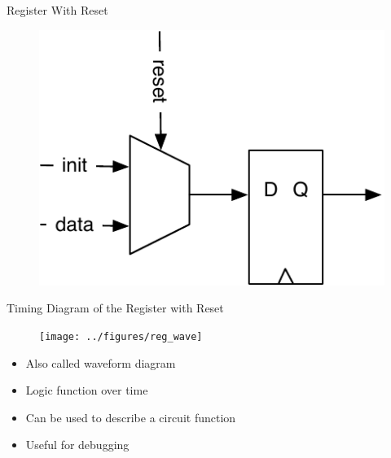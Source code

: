 \begin{frame}[fragile]{Register With Reset}
\begin{figure}
  \includegraphics[scale=\scale]{../figures/register-reset}
\end{figure}
\end{frame}

\begin{frame}[fragile]{Timing Diagram of the Register with Reset}
\begin{figure}
  \texttt{[image: ../figures/reg\_wave]}
\end{figure}
\begin{itemize}
\item Also called waveform diagram
\item Logic function over time
\item Can be used to describe a circuit function
\item Useful for debugging
\end{itemize}
\end{frame}

